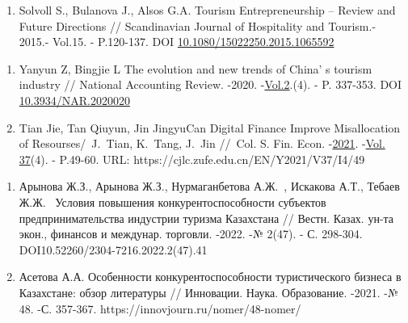\begin{references}

\begin{enumerate}
\def\labelenumi{\arabic{enumi}.}
\item
  Solvoll S., Bulanova J., Alsos G.A. Tourism Entrepreneurship -- Review
  and Future Directions // \linebreak Scandinavian Journal of Hospitality and
  Tourism.- 2015.- Vol.15. - P.120-137. \linebreak DOI \href{http://dx.doi.org/10.1080/15022250.2015.1065592}{10.1080/15022250.2015.1065592}
\end{enumerate}

\begin{enumerate}
\def\labelenumi{\arabic{enumi}.}
\setcounter{enumi}{1}
\item
  Yanyun Z, Bingjie L The evolution and new trends of
  China' s tourism industry // National Accounting
  Review. -2020.
  -\href{https://www.aimspress.com/nar/article/archives}{Vol.2}.(4). -
  P. 337-353. DOI
  \href{https://doi.org/10.3934/NAR.2020020}{10.3934/NAR.2020020}
\item
  Tian Jie, Tan Qiuyun, Jin JingyuCan Digital Finance Improve
  Misallocation of Resourses/~J.~Tian, K.~Tang, J.~Jin //~Col. S. Fin.
  Econ.
  -\href{https://cjlc.zufe.edu.cn/EN/article/showTenYearVolumnDetail.do?nian=2021}{2021}.
  -\href{https://cjlc.zufe.edu.cn/EN/article/showTenYearVolumnDetail.do?nian=2021}{Vol.
  37}{(4)}.
  - P.49-60. URL: {https://cjlc.zufe.edu.cn/EN/Y2021/V37/I4/49}
\end{enumerate}
\begin{enumerate}
\def\labelenumi{\arabic{enumi}.}
\setcounter{enumi}{3}
\item
  Арынова Ж.З., Арынова Ж.З., Нурмаганбетова А.Ж.~, Искакова А.Т.,
  Тебаев Ж.Ж.~ Условия повышения конкурентоспособности субъектов
  предпринимательства индустрии туризма Казахстана // Вестн. Казах.
  ун-та экон., финансов и междунар. торговли. -2022. -№ 2(47). - С.
  298-304.\\ DOI10.52260/2304-7216.2022.2(47).41
\item
  Асетова А.А. Особенности конкурентоспособности туристического бизнеса
  в Казахстане: обзор литературы // Инновации. Наука. Образование.
  -2021. -№ 48. -С. 357-367.   https://innovjourn.ru/nomer/48-nomer/
\end{enumerate}


\end{references}
